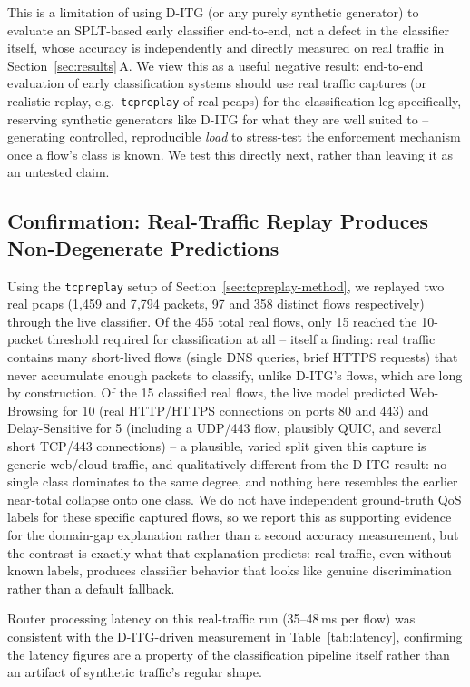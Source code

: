 \documentclass[10pt,twocolumn]{article}
\begin{document}
This is a limitation of using D-ITG (or any purely synthetic generator)
to evaluate an SPLT-based early classifier end-to-end, not a defect in
the classifier itself, whose accuracy is independently and directly
measured on real traffic in Section~\ref{sec:results}\,A. We view
this as a useful negative result: end-to-end evaluation of early
classification systems should use real traffic captures (or realistic
replay, e.g.\ \texttt{tcpreplay} of real pcaps) for the classification
leg specifically, reserving synthetic generators like D-ITG for what they
are well suited to -- generating controlled, reproducible \emph{load} to
stress-test the enforcement mechanism once a flow's class is known. We
test this directly next, rather than leaving it as an untested claim.

\subsection{Confirmation: Real-Traffic Replay Produces Non-Degenerate Predictions}
\label{sec:tcpreplay-results}

Using the \texttt{tcpreplay} setup of Section~\ref{sec:tcpreplay-method},
we replayed two real pcaps (1{,}459 and 7{,}794 packets, 97 and 358
distinct flows respectively) through the live classifier. Of the 455
total real flows, only 15 reached the 10-packet threshold required for
classification at all -- itself a finding: real traffic contains many
short-lived flows (single DNS queries, brief HTTPS requests) that never
accumulate enough packets to classify, unlike D-ITG's flows, which are
long by construction. Of the 15 classified real flows, the live model
predicted Web-Browsing for 10 (real HTTP/HTTPS connections on ports 80
and 443) and Delay-Sensitive for 5 (including a UDP/443 flow, plausibly
QUIC, and several short TCP/443 connections) -- a plausible, varied split
given this capture is generic web/cloud traffic, and qualitatively
different from the D-ITG result: no single class dominates to the same
degree, and nothing here resembles the earlier near-total collapse onto
one class. We do not have independent ground-truth QoS labels for these
specific captured flows, so we report this as supporting evidence for the
domain-gap explanation rather than a second accuracy measurement, but the
contrast is exactly what that explanation predicts: real traffic, even
without known labels, produces classifier behavior that looks like
genuine discrimination rather than a default fallback.

Router processing latency on this real-traffic run (35--48\,ms per
flow) was consistent with the D-ITG-driven measurement in
Table~\ref{tab:latency}, confirming the latency figures are a property of
the classification pipeline itself rather than an artifact of synthetic
traffic's regular shape.
\end{document}
